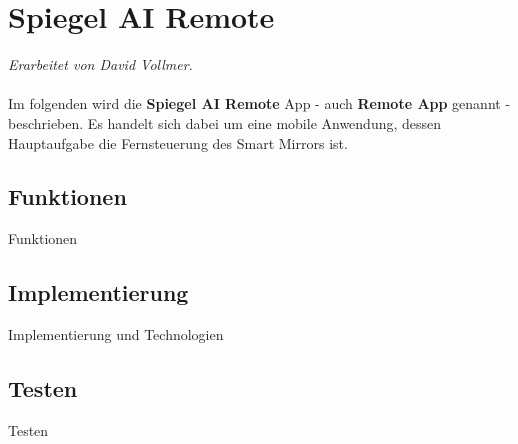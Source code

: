 \chapter{Spiegel AI Remote}
\textit{Erarbeitet von David Vollmer.}
\\ \\
Im folgenden wird die \textbf{Spiegel AI Remote} App - auch \textbf{Remote App} genannt - beschrieben. Es handelt sich dabei um eine mobile Anwendung, dessen Hauptaufgabe die Fernsteuerung des Smart Mirrors ist.

\section{Funktionen}
Funktionen

\section{Implementierung}
Implementierung und Technologien

\section{Testen}
Testen